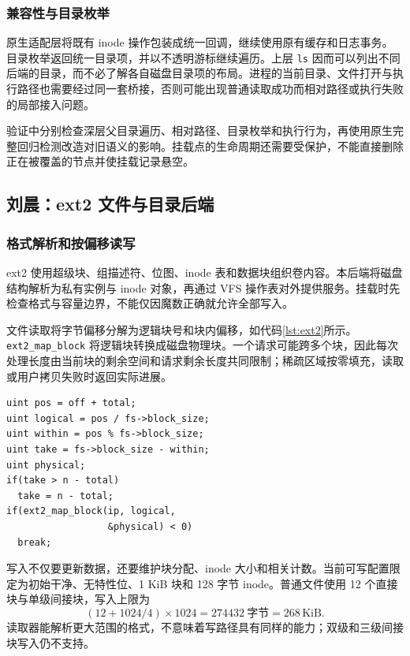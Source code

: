\documentclass[conference]{IEEEtran}
\newcommand{\code}[1]{\texttt{#1}}
\newcommand{\KiB}{\,\mathrm{KiB}}
\begin{document}
\subsubsection{兼容性与目录枚举}
原生适配层将既有 inode 操作包装成统一回调，继续使用原有缓存和日志事务。目录枚举返回统一目录项，并以不透明游标继续遍历。上层 \code{ls} 因而可以列出不同后端的目录，而不必了解各自磁盘目录项的布局。进程的当前目录、文件打开与执行路径也需要经过同一套桥接，否则可能出现普通读取成功而相对路径或执行失败的局部接入问题。

验证中分别检查深层父目录遍历、相对路径、目录枚举和执行行为，再使用原生完整回归检测改造对旧语义的影响。挂载点的生命周期还需要受保护，不能直接删除正在被覆盖的节点并使挂载记录悬空。

\subsection{刘晨：ext2 文件与目录后端}
\subsubsection{格式解析和按偏移读写}
ext2 使用超级块、组描述符、位图、inode 表和数据块组织卷内容。本后端将磁盘结构解析为私有实例与 inode 对象，再通过 VFS 操作表对外提供服务。挂载时先检查格式与容量边界，不能仅因魔数正确就允许全部写入。

文件读取将字节偏移分解为逻辑块号和块内偏移，如代码\ref{lst:ext2}所示。\code{ext2\_map\_block} 将逻辑块转换成磁盘物理块。一个请求可能跨多个块，因此每次处理长度由当前块的剩余空间和请求剩余长度共同限制；稀疏区域按零填充，读取或用户拷贝失败时返回实际进展。

\begin{lstlisting}[caption={ext2 单次块内处理长度（节选自 kernel/ext2.c）},label={lst:ext2}]
uint pos = off + total;
uint logical = pos / fs->block_size;
uint within = pos % fs->block_size;
uint take = fs->block_size - within;
uint physical;
if(take > n - total)
  take = n - total;
if(ext2_map_block(ip, logical,
                  &physical) < 0)
  break;
\end{lstlisting}

写入不仅要更新数据，还要维护块分配、inode 大小和相关计数。当前可写配置限定为初始干净、无特性位、1 KiB 块和 128 字节 inode。普通文件使用 12 个直接块与单级间接块，写入上限为
\begin{equation}
 (12+1024/4)\times1024=274432\ \text{字节}=268\KiB.
\end{equation}
读取器能解析更大范围的格式，不意味着写路径具有同样的能力；双级和三级间接块写入仍不支持。
\end{document}
